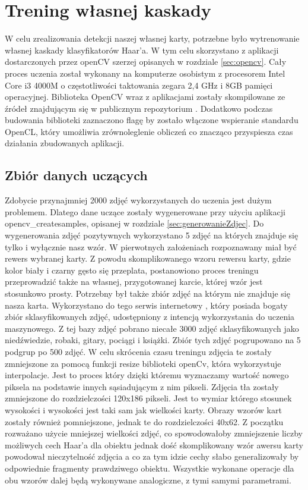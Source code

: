 \section{Trening własnej kaskady}

W celu zrealizowania detekcji naszej własnej karty, potrzebne było wytrenowanie własnej kaskady klasyfikatorów Haar'a. W tym celu skorzystano z aplikacji dostarczonych przez openCV szerzej opisanych w rozdziale \ref{sec:opencv}. Cały proces uczenia został wykonany na komputerze osobistym z procesorem Intel Core i3 4000M o częstotliwości taktowania zegara 2,4 GHz i 8GB pamięci operacyjnej. Biblioteka OpenCV wraz z aplikacjami zostały skompilowane ze źródeł znajdującym się w publicznym repozytorium \cite{OpenCVSource}. Dodatkowo podczas budowania biblioteki zaznaczono flagę by zostało włączone wspieranie standardu OpenCL, który umożliwia zrównoleglenie obliczeń co znacząco przyspiesza czas działania zbudowanych aplikacji.

\subsection{Zbiór danych uczących}

Zdobycie przynajmniej 2000 zdjęć wykorzystanych do uczenia jest dużym problemem. Dlatego dane uczące zostały wygenerowane przy użyciu aplikacji opencv\_createsamples, opisanej w rozdziale \ref{sec:generowanieZdjec}. Do wygenerowania zdjęć pozytywnych wykorzystano 5 zdjęć na których znajduje się tylko i wyłącznie nasz wzór. W pierwotnych założeniach rozpoznawany miał być rewers wybranej karty. Z powodu skomplikowanego wzoru rewersu karty, gdzie kolor biały i czarny gęsto się przeplata, postanowiono proces treningu przeprowadzić także na własnej, przygotowanej karcie, której wzór jest stosunkowo prosty. Potrzebny był także zbiór zdjęć na którym nie znajduje się nasza karta. Wykorzystano do tego serwis internetowy \cite{imageNetOrg}, który posiada bogaty zbiór sklasyfikowanych zdjęć, udostępniony z intencją wykorzystania do uczenia maszynowego. Z tej bazy zdjęć pobrano niecałe 3000 zdjęć sklasyfikowanych jako niedźwiedzie, robaki, gitary, pociągi i książki. Zbiór tych zdjęć pogrupowano na 5 podgrup po 500 zdjęć. W celu skrócenia czasu treningu zdjęcia te zostały zmniejszone za pomocą funkcji resize biblioteki openCv, która wykorzystuje interpolacje. Jest to proces który dzięki któremu wyznaczamy wartość nowego piksela na podstawie innych sąsiadującym z nim pikseli. Zdjęcia tła zostały zmniejszone do rozdzielczości 120x186 pikseli. Jest to wymiar którego stosunek wysokości i wysokości jest taki sam jak wielkości karty. Obrazy wzorów kart zostały również pomniejszone, jednak te do rozdzielczości 40x62. Z początku rozważano użycie mniejszej wielkości zdjęć, co spowodowałoby zmniejszenie liczby możliwych cech Haar'a dla obiektu jednak dość skomplikowany wzór awersu karty powodował nieczytelność zdjęcia a co za tym idzie cechy słabo generalizowały by odpowiednie fragmenty prawdziwego obiektu. Wszystkie wykonane operacje dla obu wzorów dalej będą wykonywane analogiczne, z tymi samymi parametrami.

